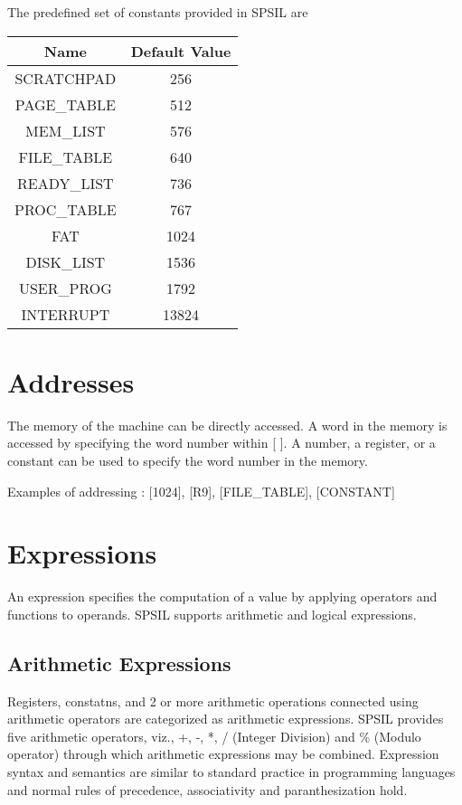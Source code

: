 \documentclass[11pt]{article}
\begin{document}
The predefined set of constants provided in SPSIL are \\

\begin{tabular}{| c | c |}
\hline
\textbf{Name} & \textbf{Default Value} \\
\hline
SCRATCHPAD 	& 	256 \\
\hline
PAGE\_TABLE 	& 	512  \\
\hline
MEM\_LIST 	&	576 	\\
\hline
FILE\_TABLE 	& 	640		\\
\hline
READY\_LIST 	& 	736	\\
\hline
PROC\_TABLE 	& 	767 \\
\hline
FAT 		& 	1024    \\
\hline
DISK\_LIST 	& 	1536 	\\
\hline
USER\_PROG 	& 	1792	\\
\hline
INTERRUPT & 	13824	\\
\hline
\end{tabular}

\section{Addresses}
The memory of the machine can be directly accessed. A word in the memory is accessed by specifying the word number within [ ]. A number, a register, or a constant can be used to specify the word number in the memory.

Examples of addressing : [1024], [R9], [FILE\_TABLE], [CONSTANT]

\section{Expressions}
An expression specifies the computation of a value by applying operators and functions to operands. SPSIL supports arithmetic and logical expressions.

\subsection{Arithmetic Expressions}

Registers, constatns, and 2 or more arithmetic operations connected using arithmetic operators are categorized as arithmetic expressions. SPSIL provides five arithmetic operators, viz., +, -, *, / (Integer Division) and \% (Modulo operator) through which arithmetic expressions may be combined. Expression syntax and semantics are similar to standard practice in programming languages and normal rules of precedence, associativity and paranthesization hold. 
\end{document}
